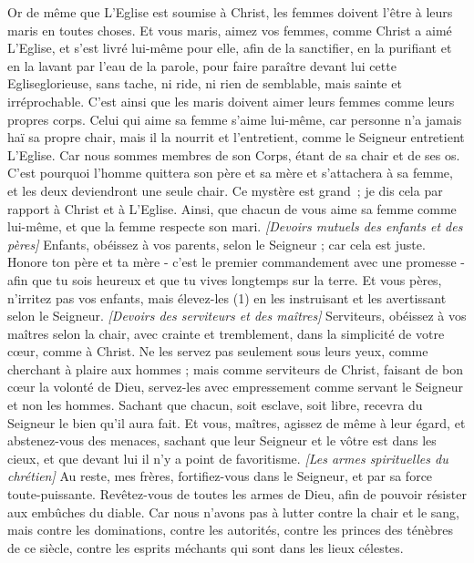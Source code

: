 \begin{multicols}{2}
Or de même que L’Eglise est soumise à Christ, les femmes doivent l’être à leurs maris en toutes choses.
Et vous maris, aimez vos femmes, comme Christ a aimé L’Eglise, et s'est livré lui-même pour elle,
afin de la sanctifier, en la purifiant et en la lavant par l’eau de la parole,
pour faire paraître devant lui cette Egliseglorieuse, sans tache, ni ride, ni rien de semblable, mais sainte et irréprochable.
C’est ainsi que les maris doivent aimer leurs femmes comme leurs propres corps. Celui qui aime sa femme s'aime lui-même,
car personne n'a jamais haï sa propre chair, mais il la nourrit et l'entretient, comme le Seigneur entretient L’Eglise.
Car nous sommes membres de son Corps, étant de sa chair et de ses os.
C'est pourquoi l'homme quittera son père et sa mère et s’attachera à sa femme, et les deux deviendront une seule chair.
Ce mystère est grand ; je dis cela par rapport à Christ et à L’Eglise.
Ainsi, que chacun de vous aime sa femme comme lui-même, et que la femme respecte son mari.
\textit{[Devoirs mutuels des enfants et des pères]}
\VerseOne{}Enfants, obéissez à vos parents, selon le Seigneur ; car cela est juste.
Honore ton père et ta mère - c’est le premier commandement avec une promesse -
afin que tu sois heureux et que tu vives longtemps sur la terre.
Et vous pères, n'irritez pas vos enfants, mais élevez-les (1) en les instruisant et les avertissant selon le Seigneur.
\textit{[Devoirs des serviteurs et des maîtres]}
Serviteurs, obéissez à vos maîtres selon la chair, avec crainte et tremblement, dans la simplicité de votre cœur, comme à Christ.
Ne les servez pas seulement sous leurs yeux, comme cherchant à plaire aux hommes ; mais comme serviteurs de Christ, faisant de bon cœur la volonté de Dieu,
servez-les avec empressement comme servant le Seigneur et non les hommes.
Sachant que chacun, soit esclave, soit libre, recevra du Seigneur le bien qu'il aura fait.
Et vous, maîtres, agissez de même à leur égard, et abstenez-vous des menaces, sachant que leur Seigneur et le vôtre est dans les cieux, et que devant lui il n'y a point de favoritisme.
\textit{[Les armes spirituelles du chrétien]}
Au reste, mes frères, fortifiez-vous dans le Seigneur, et par sa force toute-puissante.
Revêtez-vous de toutes les armes de Dieu, afin de pouvoir résister aux embûches du diable.
Car nous n'avons pas à lutter contre la chair et le sang, mais contre les dominations, contre les autorités, contre les princes des ténèbres de ce siècle, contre les esprits méchants qui sont dans les lieux célestes.

\end{multicols}
